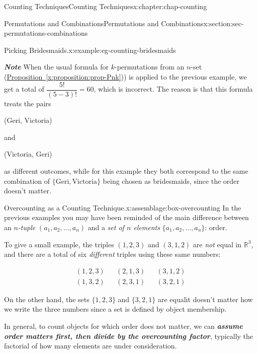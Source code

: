 \documentclass[oneside,10pt,]{book}
\newcommand{\xreffont}{\relax}
\newcommand{\alert}[1]{\textbf{\textit{#1}}}
\numberwithin{equation}{section}
\newcommand{\amp}{&}
\begin{document}
\begin{chapterptx}{Counting Techniques}{}{Counting Techniques}{}{}{x:chapter:chap-counting}
\begin{sectionptx}{Permutations and Combinations}{}{Permutations and Combinations}{}{}{x:section:sec-permutations-combinations}
\begin{example}{Picking Bridesmaids.}{x:example:eg-counting-bridesmaids}
\par
\alert{Note} When the usual formula for \(k\)-permutations from an \(n\)-set (\hyperref[x:proposition:prop-Pnk]{Proposition~{\xreffont\ref{x:proposition:prop-Pnk}}})) is applied to the previous example, we get a total of \(\dfrac{5!}{(5-3)!} = 60\), which is incorrect. The reason is that this formula treats the pairs%
\begin{sidebyside}{3}{0.2}{0.2}{0}%
\begin{sbspanel}{0.25}%
(Geri, Victoria)%
\end{sbspanel}%
\begin{sbspanel}{0.1}%
\par
and%
\end{sbspanel}%
\begin{sbspanel}{0.25}%
\par
(Victoria, Geri)%
\end{sbspanel}%
\end{sidebyside}%
\par
as different outcomes, while for this example they both correspond to the same combination of \(\{\text{Geri}, \text{Victoria}\}\) being chosen as bridesmaids, since the order doesn't matter.%
\end{example}
\begin{assemblage}{Overcounting as a Counting Technique.}{x:assemblage:box-overcounting}%
In the previous examples you may have been reminded of the main difference between an \emph{\(n\)-tuple} \((a_1,a_2,\ldots,a_n)\) and a \emph{set of \(n\) elements} \(\{a_1,a_2,\ldots,a_n\}\): order.%
\par
To give a small example, the triples \((1,2,3)\) and \((3,1,2)\) are \emph{not} equal in \(\mathbb{R}^3\), and there are a total of six \emph{different} triples using these same numbers:%
\par
%
\begin{align*}
(1,2,3) \amp \amp (2,1,3) \amp \amp (3,1,2)\\
(1,3,2) \amp \amp (2,3,1) \amp \amp (3,2,1)
\end{align*}
%
\par
On the other hand, the sets \(\{1,2,3\}\) and \(\{3,2,1\}\) are equal\textemdash{}it doesn't matter how we write the three numbers since a set is defined by object membership.%
\par
In general, to count objects for which order does not matter, we can \alert{assume order matters first, then divide by the overcounting factor}, typically the factorial of how many elements are under consideration.%

\end{assemblage}
\end{sectionptx}
\end{chapterptx}
\end{document}
